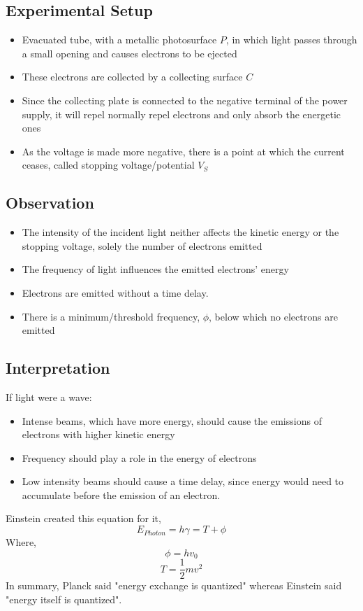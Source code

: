 \subsection{Experimental Setup}
\begin{itemize}
\item Evacuated tube, with a metallic photosurface $P$, in which light passes through a small opening and causes electrons to be ejected
\item These
electrons are collected by a collecting surface $C$
\item Since the collecting plate is connected to the negative
terminal of the power supply, it will repel normally repel
electrons and only absorb the energetic ones
\item  As the voltage is made more negative, there is a point at
which the current ceases, called stopping
voltage/potential $V_{S}$
\end{itemize}
\subsection{Observation}
\begin{itemize}
\item The intensity of the incident light neither affects the
kinetic energy or the stopping voltage, solely the
number of electrons emitted
\item  The frequency of light influences the emitted
electrons' energy
\item  Electrons are emitted without a time delay.
\item  There is a minimum/threshold frequency, $\phi$, below
which no electrons are emitted
\end{itemize}

\subsection{Interpretation}
If light were a wave:
\begin{itemize}
\item Intense beams, which have more energy, should cause
the emissions of electrons with higher kinetic energy
\item Frequency should play a role in the energy of
electrons
\item Low intensity beams should cause a time delay, since
energy would need to accumulate before the emission
of an electron.

\end{itemize}
Einstein created this equation for it,
\begin{equation}
	E_{Photon} = h \gamma = T + \phi
\end{equation}
Where,
$$\phi = hv_{0}$$
$$T = \frac{1}{2}mv^{2}$$
In summary, Planck said "energy exchange is quantized" whereas Einstein said "energy itself is quantized".
